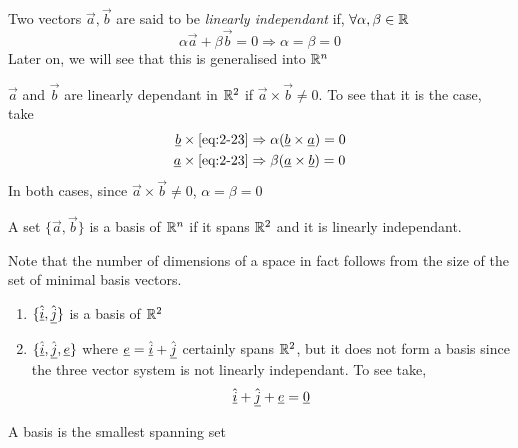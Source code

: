 \documentclass{article}
\numberwithin{equation}{section}
\begin{document}
\begin{defi}
    Two vectors $\vec{a}, \vec{b}$ are said to be \emph{linearly independant} if, $\forall \alpha, \beta \in \R$
    \begin{equation}
        \alpha \vec{a} + \beta \vec{b} = 0 \Rightarrow \alpha = \beta = 0 \label{eq:2-23}
    \end{equation}
    Later on, we will see that this is generalised into $\R^n$
\end{defi}

\begin{remark}
    $\vec{a}$ and $\vec{b}$ are linearly dependant in $\R^2$ if $\vec{a} \times \vec{b} \neq 0$. To see that it is the case, take
    \begin{align*}
        \vec{b} \times \eqref{eq:2-23} &\Rightarrow \alpha (\vec{b} \times \vec{a}) = 0 \\
        \vec{a} \times \eqref{eq:2-23} &\Rightarrow \beta (\vec{a} \times \vec{b}) = 0 \\
    \end{align*}
    In both cases, since $\vec{a} \times \vec{b} \neq 0$, $\alpha = \beta = 0$
\end{remark}

\begin{defi}[Basis]
    A set $\{\vec{a}, \vec{b}\}$ is a basis of $\R^n$ if it spans $\R^2$ and it is linearly independant.
\end{defi}

\begin{remark}
    Note that the number of dimensions of a space in fact follows from the size of the set of minimal basis vectors.
\end{remark}

\begin{eg}
    \begin{enumerate}
        \item $\{\uvec{i}, \uvec{j}\}$ is a basis of $\R^2$
        \item $\{\uvec{i}, \uvec{j}, \vec{e}\}$ where $\vec{e} = \uvec{i} + \uvec{j}$ certainly spans $\R^2$, but it does not form a basis since the three vector system is not linearly independant. To see take,
        \[
            \uvec{i} + \uvec{j} + \vec{e} = \vec{0}    
        \]
    \end{enumerate}
\end{eg}

\begin{prop}
    A basis is the smallest spanning set
\end{prop}
\end{document}
